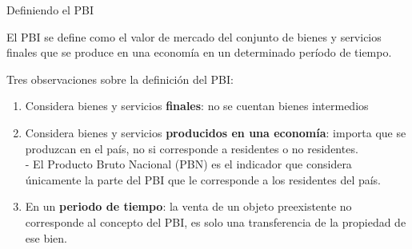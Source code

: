 \documentclass{beamer}
\begin{document}
\begin{frame}{Definiendo el PBI}
    \begin{boxB}
    \centering
        El PBI se define como el valor de mercado del conjunto de bienes y servicios finales que se produce en una economía en un determinado período de tiempo.
    \end{boxB}
    \vspace{2mm}
    Tres observaciones sobre la definición del PBI:
    \begin{enumerate}
        \item Considera bienes y servicios \textbf{finales}: no se cuentan bienes intermedios
        \item Considera bienes y servicios \textbf{producidos en una economía}: importa que se produzcan en el país, no si corresponde a residentes o no residentes. \\
        {\footnotesize - El Producto Bruto Nacional (PBN) es el indicador que considera únicamente la parte del PBI que le corresponde a los residentes del país.}
        \item En un \textbf{periodo de tiempo}: la venta de un objeto preexistente no corresponde al concepto del PBI, es solo una transferencia de la propiedad de ese bien. 
    \end{enumerate}
\end{frame}
\end{document}
